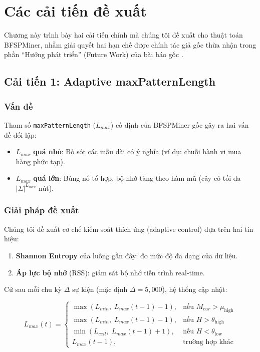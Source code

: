 \documentclass[14pt,a4paper,oneside]{extreport}
\begin{document}
\chapter{Các cải tiến đề xuất}
\label{chap:improvements}

Chương này trình bày hai cải tiến chính mà chúng tôi đề xuất cho thuật toán BFSPMiner, nhằm giải quyết hai hạn chế được chính tác giả gốc thừa nhận trong phần ``Hướng phát triển'' (Future Work) của bài báo gốc \cite{hassani2019}.

\section{Cải tiến 1: Adaptive maxPatternLength}
\label{sec:adaptive}

\subsection{Vấn đề}
Tham số \texttt{maxPatternLength} ($L_{max}$) cố định của BFSPMiner gốc gây ra hai vấn đề đối lập:
\begin{itemize}
    \item $L_{max}$ \textbf{quá nhỏ}: Bỏ sót các mẫu dài có ý nghĩa (ví dụ: chuỗi hành vi mua hàng phức tạp).
    \item $L_{max}$ \textbf{quá lớn}: Bùng nổ tổ hợp, bộ nhớ tăng theo hàm mũ (cây có tối đa $|\Sigma|^{L_{max}}$ nút).
\end{itemize}

\subsection{Giải pháp đề xuất}
Chúng tôi đề xuất cơ chế kiểm soát thích ứng (adaptive control) dựa trên hai tín hiệu:
\begin{enumerate}
    \item \textbf{Shannon Entropy} của luồng gần đây: đo mức độ đa dạng của dữ liệu.
    \item \textbf{Áp lực bộ nhớ} (RSS): giám sát bộ nhớ tiến trình real-time.
\end{enumerate}

Cứ sau mỗi chu kỳ $\Delta$ sự kiện (mặc định $\Delta = 5{,}000$), hệ thống cập nhật:

\begin{equation}
    L_{max}(t) = \begin{cases} 
      \max(L_{min},\; L_{max}(t\!-\!1) - 1), & \text{nếu } M_{cur} > \mu_{\text{high}} \\
      \max(L_{min},\; L_{max}(t\!-\!1) - 1), & \text{nếu } H > \theta_{\text{high}} \\
      \min(L_{ceil},\; L_{max}(t\!-\!1) + 1), & \text{nếu } H < \theta_{\text{low}} \\
      L_{max}(t\!-\!1), & \text{trường hợp khác}
   \end{cases}
\end{equation}
\end{document}
